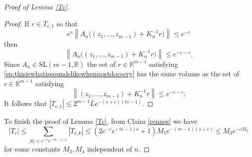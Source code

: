 \documentclass[10pt,reqno]{amsart}
\theoremstyle{Theorem}
\theoremstyle{definition}
\theoremstyle{remark}
\newcommand{\R}{\mathbb {R}}
\newcommand{\Sl}{\mathrm{SL}}
\newcommand{\inv}{^{-1}}
\def\blue{}
\begin{document}
\begin{proof}[Proof of Lemma \ref{Tc}]
\begin{proof}
If $r\in T_{c,1}$ so that
$$e^s\left\| A_n \Big(
 (z_1, \dots, z_{m-1}) + K_n\inv   r\Big)
\right\|  \le e^{-c}$$
then
\begin{equation}\label{eq:thisiswhatissoundslikewhenpostdocscry}\left\| A_n \Big(
 (z_1, \dots, z_{m-1}) + K_n\inv   r\Big)
\right\|  \le e^{-c-s}.\end{equation}
Since $A_n\in \Sl(m-1,\R)$ the set of $r\in \R^{m-1}$ satisfying  \eqref{eq:thisiswhatissoundslikewhenpostdocscry}
has the same volume as the set of $r\in \R^{m-1}$ satisfying
\[\left\|
 (z_1, \dots, z_{m-1}) + K_n\inv   r \right\|  \le e^{-c-s}. \]
{\blue  It follows that $|T_{c,1}|\le   2^{m-1} L e^{-(s+c)(m-1)}$.}\end{proof}

To finish the proof of Lemma \ref{Tc}, from Claim \ref{rennes} we have $$|T_c| \leq \sum_{|k| < e^{-c} e^{(m-1)s}} |T_{c,k}| \leq (2e^{-c} e^{(m-1)s}+1) M_5 e^{-(m-1)(s+c)} \leq M_3e^{-cM_4}$$ for some constants $M_3, M_4$ independent of $n$.
\end{proof}
\end{document}
